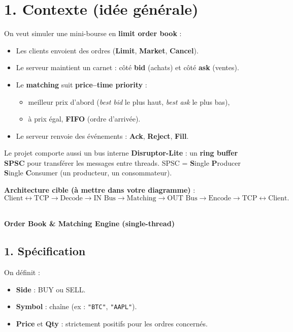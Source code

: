 \documentclass[11pt,a4paper]{article}
\newcommand{\Part}[2]{%
  \vspace{1.0em}
  \noindent{\large\textbf{Part #1}}\\
  \textbf{#2}\\
  \vspace{0.5em}
}
\begin{document}
\section*{1. Contexte (idée générale)}
On veut simuler une mini-bourse en \textbf{limit order book} :
\begin{itemize}
  \item Les clients envoient des ordres (\textbf{Limit}, \textbf{Market}, \textbf{Cancel}).
  \item Le serveur maintient un carnet : côté \textbf{bid} (achats) et côté \textbf{ask} (ventes).
  \item Le \textbf{matching} suit \textbf{price--time priority} :
    \begin{itemize}
      \item meilleur prix d’abord (\textit{best bid} le plus haut, \textit{best ask} le plus bas),
      \item à prix égal, \textbf{FIFO} (ordre d’arrivée).
    \end{itemize}
  \item Le serveur renvoie des événements : \textbf{Ack}, \textbf{Reject}, \textbf{Fill}.
\end{itemize}

Le projet comporte aussi un bus interne \textbf{Disruptor-Lite} : un \textbf{ring buffer SPSC} pour transférer les messages entre threads.
SPSC = \textbf{S}ingle \textbf{P}roducer \textbf{S}ingle \textbf{C}onsumer (un producteur, un consommateur).

\bigskip
\noindent\textbf{Architecture cible (à mettre dans votre diagramme)} :
\[
\text{Client} \leftrightarrow \text{TCP} \rightarrow \text{Decode} \rightarrow \text{IN Bus} \rightarrow
\text{Matching} \rightarrow \text{OUT Bus} \rightarrow \text{Encode} \rightarrow \text{TCP} \leftrightarrow \text{Client}.
\]

\Part{I}{Order Book \& Matching Engine (single-thread)}

\subsection*{1. Spécification}
On définit :
\begin{itemize}
  \item \textbf{Side} : BUY ou SELL.
  \item \textbf{Symbol} : chaîne (ex : \texttt{"BTC"}, \texttt{"AAPL"}).
  \item \textbf{Price} et \textbf{Qty} : strictement positifs pour les ordres concernés.
\end{itemize}
\end{document}
